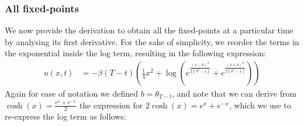 \newpage
\subsubsection{All fixed-points}
We now provide the derivation to obtain all the fixed-points at a particular time by analysing its first derivative. For the sake of simplicity, we reorder the terms in the exponential inside the log term, resulting in the following expression:
\begin{align}
    u(x, t) &= -\beta(T - t) \left( \frac{1}{4} x^2 +  \log{\left(e^{\frac{(x - b)^2}{2 (b^2 -1)}} + e^{\frac{(x + b)^2}{2 (b^2 -1)}} \right)} \right)
\end{align}
Again for ease of notation we defined $b= \theta_{T-t}$, and note that we can derive from $\cosh(x) = \frac{e^x + e^{-x}}{2}$  the expression for $2\cosh(x) =  e^x + e^{-x}$, which we use to re-express the log term as follows:

